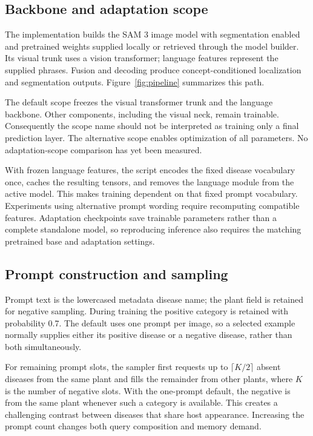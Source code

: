 \subsection{Backbone and adaptation scope}
The implementation builds the SAM 3 image model with segmentation enabled and pretrained weights supplied locally or retrieved through the model builder. Its visual trunk uses a vision transformer; language features represent the supplied phrases. Fusion and decoding produce concept-conditioned localization and segmentation outputs. Figure~\ref{fig:pipeline} summarizes this path.

The default  scope freezes the visual transformer trunk and the language backbone. Other components, including the visual neck, remain trainable. Consequently the scope name should not be interpreted as training only a final prediction layer. The alternative  scope enables optimization of all parameters. No adaptation-scope comparison has yet been measured.

With frozen language features, the script encodes the fixed disease vocabulary once, caches the resulting tensors, and removes the language module from the active model. This makes training dependent on that fixed prompt vocabulary. Experiments using alternative prompt wording require recomputing compatible features. Adaptation checkpoints save trainable parameters rather than a complete standalone model, so reproducing inference also requires the matching pretrained base and adaptation settings.

\subsection{Prompt construction and sampling}
Prompt text is the lowercased metadata disease name; the plant field is retained for negative sampling. During training the positive category is retained with probability 0.7. The default uses one prompt per image, so a selected example normally supplies either its positive disease or a negative disease, rather than both simultaneously.

For remaining prompt slots, the sampler first requests up to $\lceil K/2\rceil$ absent diseases from the same plant and fills the remainder from other plants, where $K$ is the number of negative slots. With the one-prompt default, the negative is from the same plant whenever such a category is available. This creates a challenging contrast between diseases that share host appearance. Increasing the prompt count changes both query composition and memory demand.

